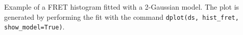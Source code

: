 \label{fig:histfit} Example of a FRET histogram fitted with a 2-Gaussian model.
The plot is generated by performing the fit with the command
\texttt{dplot(ds, hist\_fret, show\_model=True)}.
